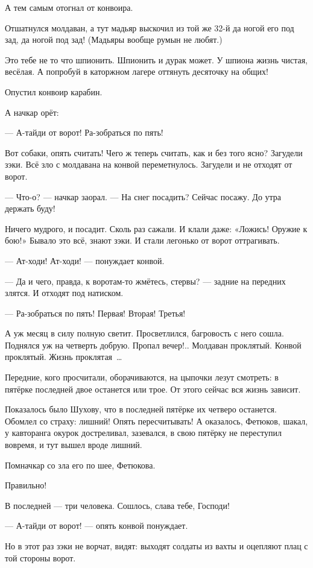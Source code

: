 А тем самым отогнал от конвоира.

Отшатнулся молдаван, а тут мадьяр выскочил из той же 32-й да ногой его под зад, да ногой под зад! (Мадьяры вообще румын не любят.)

Это тебе не то что шпионить. Шпионить и дурак может. У шпиона жизнь чистая, весёлая. А попробуй в каторжном лагере оттянуть десяточку на общих!

Опустил конвоир карабин.

А начкар орёт:

--- А-тайди от ворот! Ра-зобраться по пять!

Вот собаки, опять считать! Чего ж теперь считать, как и без того ясно? Загудели зэки. Всё зло с молдавана на конвой переметнулось. Загудели и не отходят от ворот.

--- Что-о? --- начкар заорал. --- На снег посадить? Сейчас посажу. До утра держать буду!

Ничего мудрого, и посадит. Сколь раз сажали. И клали даже: «Ложись! Оружие к бою!» Бывало это всё, знают зэки. И стали легонько от ворот оттрагивать.

--- Ат-ходи! Ат-ходи! --- понуждает конвой.

--- Да и чего, правда, к воротам-то жмётесь, стервы? --- задние на передних злятся. И отходят под натиском.

--- Ра-зобраться по пять! Первая! Вторая! Третья!

А уж месяц в силу полную светит. Просветлился, багровость с него сошла. Поднялся уж на четверть добрую. Пропал вечер!.. Молдаван проклятый. Конвой проклятый. Жизнь проклятая~\dots{}

Передние, кого просчитали, оборачиваются, на цыпочки лезут смотреть: в пятёрке последней двое останется или трое. От этого сейчас вся жизнь зависит.

Показалось было Шухову, что в последней пятёрке их четверо останется. Обомлел со страху: лишний! Опять пересчитывать! А оказалось, Фетюков, шакал, у кавторанга окурок достреливал, зазевался, в свою пятёрку не переступил вовремя, и тут вышел вроде лишний.

Помначкар со зла его по шее, Фетюкова.

Правильно!

В последней --- три человека. Сошлось, слава тебе, Господи!

--- А-тайди от ворот! --- опять конвой понуждает.

Но в этот раз зэки не ворчат, видят: выходят солдаты из вахты и оцепляют плац с той стороны ворот.

